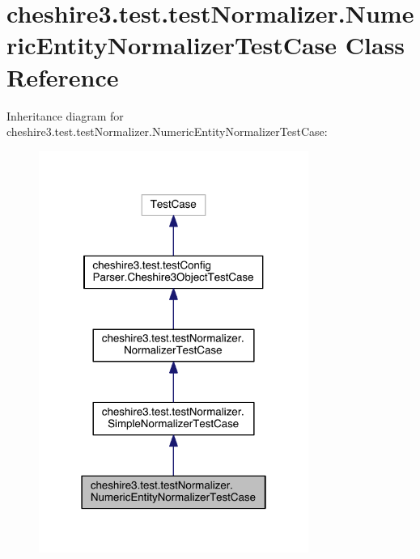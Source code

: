 \hypertarget{classcheshire3_1_1test_1_1test_normalizer_1_1_numeric_entity_normalizer_test_case}{\section{cheshire3.\-test.\-test\-Normalizer.\-Numeric\-Entity\-Normalizer\-Test\-Case Class Reference}
\label{classcheshire3_1_1test_1_1test_normalizer_1_1_numeric_entity_normalizer_test_case}
}


Inheritance diagram for cheshire3.\-test.\-test\-Normalizer.\-Numeric\-Entity\-Normalizer\-Test\-Case\-:
\nopagebreak
\begin{figure}[H]
\begin{center}
\leavevmode
\includegraphics[width=250pt]{classcheshire3_1_1test_1_1test_normalizer_1_1_numeric_entity_normalizer_test_case__inherit__graph}
\end{center}
\end{figure}


